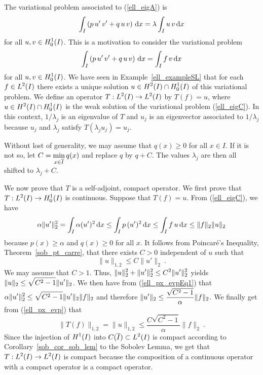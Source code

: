 \begin{egg}
The variational problem associated to (\ref{ell_eigA}) is
\begin{equation} \label{ell_eigB}
\int_I \left( p\, u'\, v'+ q\, u\, v \right) \,\mathrm{d}{x} =
\lambda \int_I u\, v \,\mathrm{d}{x}
\end{equation}
for all $\displaystyle u,v \in H_0^1(I)$.
This is a motivation to consider the variational problem
\begin{equation} \label{ell_eigC}
\int_I \left( p\, u'\, v' + q\, u\, v \right) \,\mathrm{d}{x} = \int_I f\, v \,\mathrm{d}{x}
\end{equation}
for all $\displaystyle u,v \in H_0^1(I)$.
We have seen in Example~\ref{ell_exampleSL} that for each
$\displaystyle f \in L^2(I)$ there
exists a unique solution $\displaystyle u \in H^2(I) \cap H^1_0(I)$ of this
variational problem.  We define an operator $\displaystyle T:L^2(I) \to L^2(I)$
by $T(f) = u$, where $\displaystyle u \in H^2(I) \cap H^1_0(I)$ is the
weak solution of the variational problem (\ref{ell_eigC}).  In this context,
$1/\lambda_j$ is an eigenvalue of $T$ and $u_j$ is an eigenvector
associated to $1/\lambda_j$ because $u_j$ and $\lambda_j$ satisfy
$T(\lambda_j u_j) = u_j$.

Without lost of generality, we may assume that $q(x)\geq 0$ for all
$x \in I$.  If it is not so, let
$\displaystyle C = \min_{x\in\overline{I}} q(x)$
and replace $q$ by $q + C$.  The values $\lambda_j$ are then all
shifted to $\lambda_j + C$.

We now prove that $T$ is a self-adjoint, compact operator.  We first
prove that $\displaystyle T:L^2(I) \to H_0^1(I)$ is continuous.  Suppose that
$T(f) =u$.  From (\ref{ell_eigC}), we have
\begin{equation} \label{ell_px_evpEq1}
\alpha \|u'\|_2^2 = \int_I \alpha (u')^2 \,\mathrm{d}{x}
\leq \int_I p\, (u')^2 \,\mathrm{d}{x} \leq \int_I f \, u \,\mathrm{d}{x}
\leq \|f\|_2 \|u\|_2
\end{equation}
because $p(x)\geq \alpha$ and $q(x) \geq 0$ for all $x$.
It follows from Poincar\'e's Inequality, Theorem~\ref{sob_pt_carre},
that there exists $C>0$ independent of $u$ such that
\begin{equation} \label{ell_px_evp}
\| u \|_{1,2} \leq C \|u'\|_2 \ .
\end{equation}
We may assume that $C>1$.  Thus,
$\displaystyle \|u\|_2^2 + \|u'\|_2^2 \leq C^2 \|u'\|_2^2$ yields
$\displaystyle \|u \|_2 \leq \sqrt{C^2-1} \|u'\|_2$.
We then have from (\ref{ell_px_evpEq1}) that
$\displaystyle \alpha \|u'\|_2^2 \leq \sqrt{C^2-1} \|u'\|_2 \|f\|_2$
and therefore
$\displaystyle \|u'\|_2 \leq \frac{\sqrt{C^2-1}}{\alpha} \|f\|_2$.
We finally get from (\ref{ell_px_evp}) that
\[
\|T(f)\|_{1,2} = \|u\|_{1,2} \leq \frac{C\sqrt{C^2-1}}{\alpha}
\|f\|_2 \ .
\]
Since the injection of $\displaystyle H^1(I)$ into
$\displaystyle C(\overline{I}) \subset L^2(I)$
is compact according to Corollary~\ref{sob_cor_sob_lem} to the Sobolev Lemma,
we get that $\displaystyle T:L^2(I) \to L^2(I)$ is compact because the
composition of a continuous operator with a compact operator is a
compact operator.


\end{egg}
